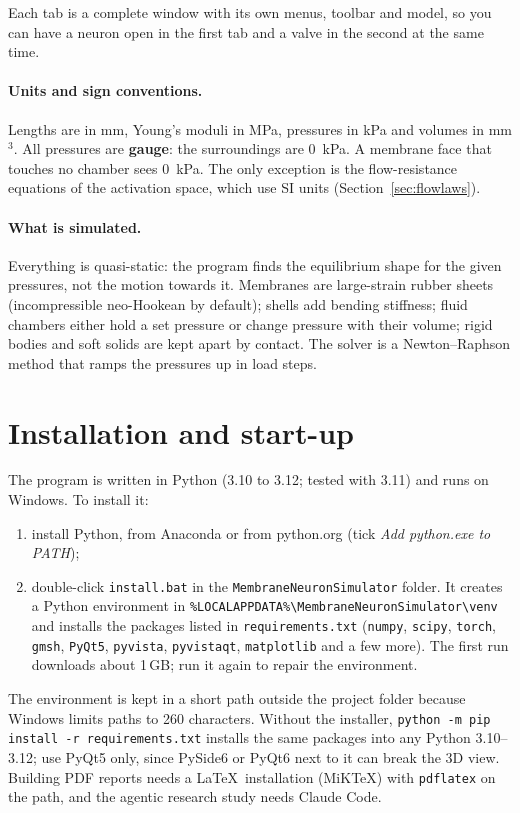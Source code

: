 \documentclass[11pt,a4paper]{article}
\newcommand{\code}[1]{\texttt{#1}}
\begin{document}
Each tab is a complete window with its own menus, toolbar and model, so you can have a neuron open in the first tab
and a valve in the second at the same time.

\paragraph{Units and sign conventions.} Lengths are in mm, Young's moduli in MPa, pressures in kPa and volumes in
mm$^3$. All pressures are \textbf{gauge}: the surroundings are 0~kPa. A membrane face that touches no chamber sees
0~kPa. The only exception is the flow-resistance equations of the activation space, which use SI units
(Section~\ref{sec:flowlaws}).

\paragraph{What is simulated.} Everything is quasi-static: the program finds the equilibrium shape for the given
pressures, not the motion towards it. Membranes are large-strain rubber sheets (incompressible neo-Hookean by
default); shells add bending stiffness; fluid chambers either hold a set pressure or change pressure with their
volume; rigid bodies and soft solids are kept apart by contact. The solver is a Newton--Raphson method that ramps the
pressures up in load steps.

\section{Installation and start-up}

The program is written in Python (3.10 to 3.12; tested with 3.11) and runs on Windows. To install it:
\begin{enumerate}
\item install Python, from Anaconda or from python.org (tick \emph{Add python.exe to PATH});
\item double-click \code{install.bat} in the \code{MembraneNeuronSimulator} folder. It creates a Python environment in
\code{\%LOCALAPPDATA\%\textbackslash MembraneNeuronSimulator\textbackslash venv} and installs the packages listed in
\code{requirements.txt} (\code{numpy}, \code{scipy}, \code{torch}, \code{gmsh}, \code{PyQt5}, \code{pyvista},
\code{pyvistaqt}, \code{matplotlib} and a few more). The first run downloads about 1\,GB; run it again to repair the
environment.
\end{enumerate}
The environment is kept in a short path outside the project folder because Windows limits paths to 260 characters.
Without the installer, \code{python -m pip install -r requirements.txt} installs the same packages into any Python
3.10--3.12; use PyQt5 only, since PySide6 or PyQt6 next to it can break the 3D view. Building PDF reports needs a
\LaTeX\ installation (MiKTeX) with \code{pdflatex} on the path, and the agentic research study needs Claude Code.
\end{document}
